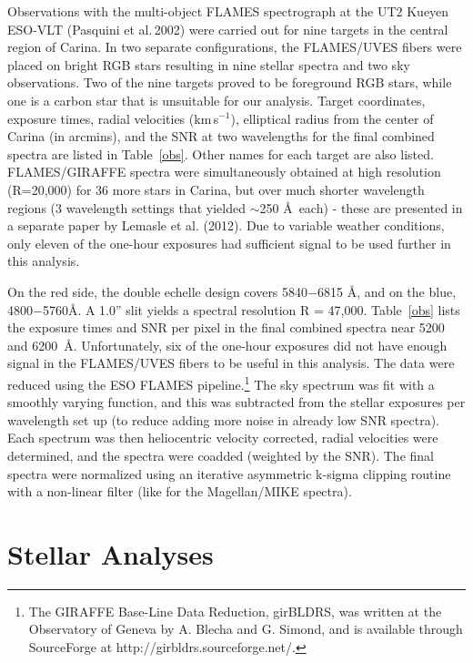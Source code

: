 \documentclass{emulateapj}
\newcommand\kms{km\,s$^{-1}$}
\newcommand\etal{{\rm et al.\,}}
\begin{document}
Observations with the multi-object FLAMES spectrograph at the
UT2 Kueyen ESO-VLT (Pasquini \etal  2002) were carried out for nine
targets in the central region of Carina.  In two separate configurations,
the FLAMES/UVES fibers were placed on bright RGB stars resulting in 
nine stellar spectra and two sky observations. 
Two of the nine targets proved to be foreground RGB stars, 
while one is a carbon star that is unsuitable for our analysis.    
Target coordinates, exposure times, 
radial velocities (\kms), 
elliptical radius from the center of Carina (in arcmins), and the SNR
at two wavelengths for the final combined spectra 
are listed in Table~\ref{obs}.     
Other names for each target are also listed.
%
FLAMES/GIRAFFE spectra were simultaneously obtained at  
high resolution (R=20,000) for 36 more stars in Carina, 
but over much shorter wavelength regions (3 wavelength 
settings that yielded $\sim$250 \AA\ each) - 
these are presented in a separate paper by Lemasle et al. (2012).
Due to variable weather conditions, only eleven of the one-hour 
exposures had sufficient signal to be used further in this analysis.   

On the red side, the double echelle design covers 5840$-$6815 \AA, 
and on the blue, 4800$-$5760\AA.  A 1.0'' slit yields 
a spectral resolution R = 47,000.   Table~\ref{obs} lists
the exposure times and SNR per pixel in the final 
combined spectra near 5200 and 6200~\AA.   Unfortunately, 
six of the one-hour exposures did not have enough signal in
the FLAMES/UVES fibers to be useful in this analysis.
The data were reduced using the ESO FLAMES pipeline.\footnote{The
GIRAFFE Base-Line Data Reduction, girBLDRS, was written at the
Observatory of Geneva by A. Blecha and G. Simond, and is available 
through SourceForge at http://girbldrs.sourceforge.net/.}
%
The sky spectrum was fit with a smoothly varying function, and
this was subtracted from the stellar exposures per wavelength 
set up (to reduce adding more noise in already low SNR spectra).   
Each spectrum was then heliocentric velocity corrected, radial
velocities were determined, and the spectra were coadded 
(weighted by the SNR).   The final spectra were normalized using 
an iterative asymmetric k-sigma clipping routine with a
non-linear filter (like for the Magellan/MIKE spectra).


\section{Stellar Analyses}
\end{document}
